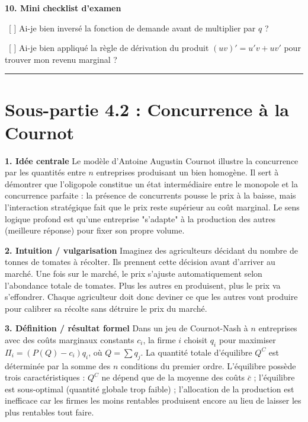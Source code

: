 \documentclass[11pt, a4paper]{report}
\begin{document}
\textbf{10. Mini checklist d’examen}
\par \textbullet\ [ ] Ai-je bien inversé la fonction de demande avant de multiplier par $q$ ?
\par \textbullet\ [ ] Ai-je bien appliqué la règle de dérivation du produit $(uv)' = u'v + uv'$ pour trouver mon revenu marginal ?

\vspace{1cm}\hrule\vspace{1cm}

\section{Sous-partie 4.2 : Concurrence à la Cournot}

\textbf{1. Idée centrale}
Le modèle d'Antoine Augustin Cournot illustre la concurrence par les quantités entre $n$ entreprises produisant un bien homogène. Il sert à démontrer que l'oligopole constitue un état intermédiaire entre le monopole et la concurrence parfaite : la présence de concurrents pousse le prix à la baisse, mais l'interaction stratégique fait que le prix reste supérieur au coût marginal. Le sens logique profond est qu'une entreprise "s'adapte" à la production des autres (meilleure réponse) pour fixer son propre volume.

\textbf{2. Intuition / vulgarisation}
Imaginez des agriculteurs décidant du nombre de tonnes de tomates à récolter. Ils prennent cette décision avant d'arriver au marché. Une fois sur le marché, le prix s'ajuste automatiquement selon l'abondance totale de tomates. Plus les autres en produisent, plus le prix va s'effondrer. Chaque agriculteur doit donc deviner ce que les autres vont produire pour calibrer sa récolte sans détruire le prix du marché.

\textbf{3. Définition / résultat formel}
Dans un jeu de Cournot-Nash à $n$ entreprises avec des coûts marginaux constants $c_i$, la firme $i$ choisit $q_i$ pour maximiser $\Pi_i = (P(Q) - c_i)q_i$, où $Q = \sum q_j$.
La quantité totale d'équilibre $Q^C$ est déterminée par la somme des $n$ conditions du premier ordre. L'équilibre possède trois caractéristiques : $Q^C$ ne dépend que de la moyenne des coûts $\bar{c}$ ; l'équilibre est sous-optimal (quantité globale trop faible) ; l'allocation de la production est inefficace car les firmes les moins rentables produisent encore au lieu de laisser les plus rentables tout faire.
\end{document}
